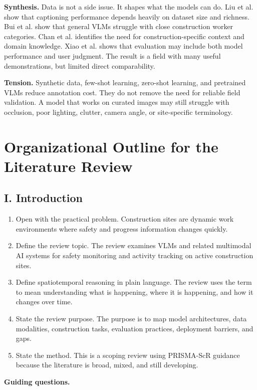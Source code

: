 \documentclass[10pt, letterpaper]{article}
\begin{document}
\textbf{Synthesis.} Data is not a side issue. It shapes what the models can do. Liu et al. show that captioning performance depends heavily on dataset size and richness. Bui et al. show that general VLMs struggle with close construction worker categories. Chan et al. identifies the need for construction-specific context and domain knowledge. Xiao et al. shows that evaluation may include both model performance and user judgment. The result is a field with many useful demonstrations, but limited direct comparability.

\textbf{Tension.} Synthetic data, few-shot learning, zero-shot learning, and pretrained VLMs reduce annotation cost. They do not remove the need for reliable field validation. A model that works on curated images may still struggle with occlusion, poor lighting, clutter, camera angle, or site-specific terminology.

\section{Organizational Outline for the Literature Review}

\subsection{I. Introduction}

\begin{enumerate}
\item Open with the practical problem. Construction sites are dynamic work environments where safety and progress information changes quickly.
\item Define the review topic. The review examines VLMs and related multimodal AI systems for safety monitoring and activity tracking on active construction sites.
\item Define spatiotemporal reasoning in plain language. The review uses the term to mean understanding what is happening, where it is happening, and how it changes over time.
\item State the review purpose. The purpose is to map model architectures, data modalities, construction tasks, evaluation practices, deployment barriers, and gaps.
\item State the method. This is a scoping review using PRISMA-ScR guidance because the literature is broad, mixed, and still developing.
\end{enumerate}

\textbf{Guiding questions.}
\end{document}
